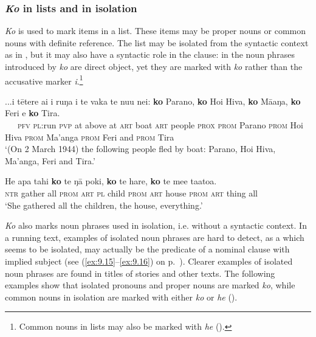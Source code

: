 \subsubsection{\textit{Ko} in lists and in isolation}\label{sec:4.7.11.1}

\textit{Ko} is used to mark items in a list. These items may be proper nouns or common nouns with definite reference. The list may be isolated from the syntactic context as in , but it may also have a syntactic role in the clause: in  the noun phrases introduced by \textit{ko} are direct object, yet they are marked with \textit{ko} rather than the accusative marker \textit{i}.\footnote{\label{fn:241}Common nouns in lists may also be marked with \textit{he} ().}

\ea\label{ex:4.320}
\gll ...i tētere ai {\ꞌ}i ruŋa i te vaka te nu{\ꞌ}u nei: \textbf{ko} Parano,  \textbf{ko} Hoi Hiva, \textbf{ko} Mā{\ꞌ}aŋa, \textbf{ko} Feri {\ꞌ}e \textbf{ko} Tira.\\
~~~\textsc{pfv} \textsc{pl}:run \textsc{pvp} at above at \textsc{art} boat \textsc{art} people \textsc{prox} \textsc{prom} Parano  \textsc{prom} Hoi Hiva \textsc{prom} Ma’anga \textsc{prom} Feri and \textsc{prom} Tira\\

\glt 
‘(On 2 March 1944) the following people fled by boat: Parano, Hoi Hiva, Ma’anga, Feri and Tira.’ \textstyleExampleref{[R539-1.592]}
\z

\ea\label{ex:4.321}
\gll He {\ꞌ}apa tahi \textbf{ko} te ŋā poki, \textbf{ko} te hare, \textbf{ko} te me{\ꞌ}e ta{\ꞌ}ato{\ꞌ}a. \\
\textsc{ntr} gather all \textsc{prom} \textsc{art} \textsc{pl} child \textsc{prom} \textsc{art} house \textsc{prom} \textsc{art} thing all \\

\glt
‘She gathered all the children, the house, everything.’ \textstyleExampleref{[R352.103]} 
\z

\textit{Ko} also marks noun phrases used in isolation, i.e. without a syntactic context. In a running text, examples of isolated noun phrases are hard to detect, as a  which seems to be isolated, may actually be the predicate of a nominal clause with implied subject (see (\ref{ex:9.15}–\ref{ex:9.16}) on p.~\pageref{ex:9.15}). Clearer examples of isolated noun phrases are found in titles of stories and other texts. The following examples show that isolated pronouns and proper nouns are marked \textit{ko}, while common nouns in isolation are marked with either \textit{ko} or \textit{he} ().

